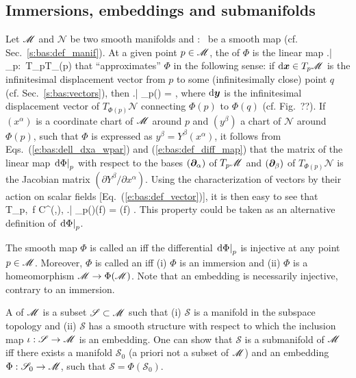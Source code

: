 \subsection{Immersions, embeddings and submanifolds} \label{s:bas:embed}

Let $\mathscr{M}$ and $\mathscr{N}$ be two smooth manifolds
and
\be
    \Phi:\ \M \longrightarrow {}
\ee
be a smooth map (cf. Sec.~\ref{s:bas:def_manif}).
At a given point $p\in\mathscr{M}$, the 
of $\Phi$ is the linear map
\be
    \left.\D\Phi \right| _p:\ T_p\M \longrightarrow T_{\Phi(p)}
\ee
that ``approximates'' $\Phi$ in the following sense: if $\mathrm{d}\bm{x}\in T_p\mathscr{M}$ is the
infinitesimal displacement vector from $p$ to some (infinitesimally close) point $q$
(cf. Sec.~\ref{s:bas:vectors}), then
\be \label{e:bas:def_diff_map}
    \left.\D\Phi \right| _p(\D{}) = \D{},
\ee
where $\mathrm{d}\bm{y}$ is the infinitesimal displacement vector of $T_{\Phi(p)}\mathscr{N}$
connecting $\Phi(p)$ to $\Phi(q)$ (cf. Fig.~??).
If $(x^\alpha)$ is a coordinate chart of $\mathscr{M}$ around $p$ and $(y^\beta)$ a chart
of $\mathscr{N}$ around $\Phi(p)$, such that $\Phi$ is expressed as
$y^\beta = Y^\beta(x^\alpha)$, it follows from Eqs.~(\ref{e:bas:dell_dxa_wpar}) and
(\ref{e:bas:def_diff_map}) that
the matrix of the linear map $\left.\mathrm{d}\Phi \right| _p$
with respect to the bases $(\bm{\partial}_\alpha)$ of $T_p\mathscr{M}$ and $(\bm{\partial}_\beta)$ of $T_{\Phi(p)}\mathscr{N}$
is the Jacobian matrix $(\partial Y^\beta / \partial x^\alpha)$.
Using the characterization of vectors by their action on scalar fields
[Eq.~(\ref{e:bas:def_vector})], it is then easy to see
that
\be
    \forall {}\in T_p\M,\ \forall f \in C^\infty(,),\quad
    \left.\D\Phi \right| _p()(f) =
        \left(f\circ \Phi \right) .
\ee
This property could be taken as an alternative definition of $\left.\mathrm{d}\Phi \right| _p$.

The smooth map $\Phi$ is called an  iff
the differential $\left.\mathrm{d}\Phi \right| _p$ is injective at any point $p\in\mathscr{M}$.
Moreover, $\Phi$ is called an  iff (i) $\Phi$
is an immersion and (ii) $\Phi$ is a homeomorphism $\mathscr{M} \rightarrow \Phi(\mathscr{M})$.
Note that an embedding is necessarily injective, contrary to an immersion.

A  of $\mathscr{M}$ is a subset $\mathscr{S}\subset \mathscr{M}$ such
that (i) $\mathscr{S}$ is a manifold in the subspace topology and (ii)
$\mathscr{S}$ has a smooth structure with respect to which
the inclusion map $\iota: \mathscr{S} \rightarrow \mathscr{M}$ is an embedding.
One can show that $\mathscr{S}$ is a submanifold of $\mathscr{M}$ iff there exists
a manifold $\mathscr{S}_0$ (a priori not a subset of $\mathscr{M}$) and an
embedding $\Phi: \mathscr{S}_0 \rightarrow \mathscr{M}$, such that
$\mathscr{S} = \Phi(\mathscr{S}_0)$.

